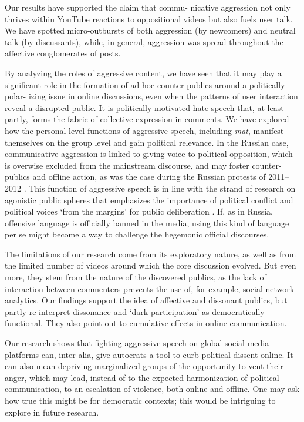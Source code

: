 Our results have supported the claim that commu- nicative aggression not only thrives within YouTube reactions to oppositional videos but also fuels user talk. We have spotted micro-outbursts of both aggression (by newcomers) and neutral talk (by discussants), while, in general, aggression was spread throughout the affective conglomerates of posts.

By analyzing the roles of aggressive content, we have seen that it may play a significant role in the formation of ad hoc counter-publics around a politically polar- izing issue in online discussions, even when the patterns of user interaction reveal a disrupted public. It is politically motivated hate speech that, at least partly, forms the fabric of collective expression in comments. We have explored how the personal-level functions of aggressive speech, including \textit{mat}, manifest themselves on the group level and gain political relevance. In the Russian case, communicative aggression is linked to giving voice to political opposition, which is overwise excluded from the mainstream discourse, and may foster counter-publics and offline action, as was the case during the Russian protests of 2011–2012 \cite{BodrunovaLitvinenko2015}. This function of aggressive speech is in line with the strand of research on agonistic public spheres that emphasizes the importance of political conflict and political voices ‘from the margins’ for public deliberation \cite[p. 128]{Dahlberg2007}. If, as in Russia, offensive language is officially banned in the media, using this kind of language per se might become a way to challenge the hegemonic official discourses.

The limitations of our research come from its exploratory nature, as well as from the limited number of videos around which the core discussion evolved. But even more, they stem from the nature of the discovered publics, as the lack of interaction between commenters prevents the use of, for example, social network analytics. Our findings support the idea of affective and dissonant publics, but partly re-interpret dissonance and ‘dark participation’ as democratically functional. They also point out to cumulative effects in online communication.

Our research shows that fighting aggressive speech on global social media platforms can, inter alia, give autocrats a tool to curb political dissent online. It can also mean depriving marginalized groups of the opportunity to vent their anger, which may lead, instead of to the expected harmonization of political communication, to an escalation of violence, both online and offline. One may ask how true this might be for democratic contexts; this would be intriguing to explore in future research.

